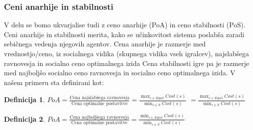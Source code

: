 \documentclass[12pt, hyperref={unicode}]{beamer}
\newtheorem{definicija}{Definicija}
\begin{document}
\begin{frame}

  \frametitle{Ceni anarhije in stabilnosti}
  V delu se bomo ukvarjalise tudi z ceno anarhije (PoA) in ceno stabilnosti (PoS).
  Ceni anarhije in stabilnosti merita, kako se učinkovitost sistema poslabša zaradi sebičnega vedenja njegovih agentov.
  Cena anarhije je razmerje med vrednostjo/ceno, iz socialnega vidika (skupnega vidika vseh igralcev), najslabšega ravnovesja in socialno ceno optimalnega izida
  Cena stabilnosti igre pa je razmerje med najboljšo socialno ceno ravnovesja in socialno ceno optimalnega izida.
  V našem primeru sta definirani kot:
  \begin{definicija}
    $PoA = \frac{\text{Cena najslabšega ravnovesja}}{\text{Cena optimalne postavitve}} = \frac{\max_{s\in Equil} Cost(s)}{\min_{s\in S} Cost(s)}$
    $=\frac{\max_{s\in Equil} Cost(s)}{\min_{s\in S} Cost(s)}$
  \end{definicija}
  \begin{definicija}
    $PoA = \frac{\text{Cena najboljšega ravnovesja}}{\text{Cena optimalne postavitve}} = \frac{\min_{s\in Equil} Cost(s)}{\min_{s\in S} Cost(s)}$
  \end{definicija}

\end{frame}
\end{document}
